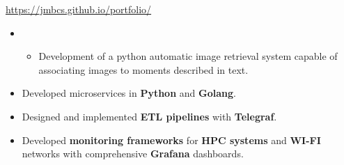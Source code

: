 \documentclass[10pt,a4paper,ragged2e,withhyper]{altacv}
\begin{document}
\begin{paracol}{2}


      \url{https://jmbcs.github.io/portfolio/}



      \begin{itemize}
            \item[]
                  \begin{itemize}
                        \item Development of a python automatic image retrieval system capable of associating
                              images to moments described in text.
                  \end{itemize}
      \end{itemize}



      \begin{itemize}
            \item Developed microservices in  \textcolor{heading}{\textbf{Python}} and \textcolor{heading}{\textbf{Golang}}.

            \item Designed and implemented \textcolor{heading}{\textbf{ETL pipelines}} with \textcolor{heading}{\textbf{Telegraf}}.          
            
            \item Developed \textcolor{heading}{\textbf{monitoring frameworks}} for \textcolor{heading}{\textbf{HPC systems}} and \textcolor{heading}{\textbf{WI-FI}} networks with comprehensive \textcolor{heading}{\textbf{Grafana}} dashboards.


\end{itemize}
\end{paracol}
\end{document}
